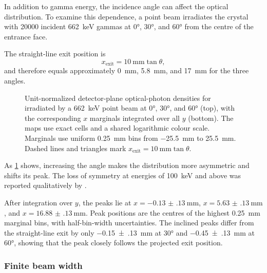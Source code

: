 In addition to gamma energy, the incidence angle can affect the optical distribution. To examine this dependence, a point beam irradiates the  crystal with \num{20000} incident \qty{662}{\kilo\electronvolt} gammas at \ang{0}, \ang{30}, and \ang{60} from the centre of the entrance face.

The straight-line exit position is
\begin{equation}
  x_{\mathrm{exit}}=\qty{10}{\milli\metre}\tan\theta,
\end{equation}
and therefore equals approximately \qty{0}{\milli\metre}, \qty{5.8}{\milli\metre}, and \qty{17}{\milli\metre} for the three angles.

\begin{figure}[H]
  \centering
  \caption{Unit-normalized detector-plane optical-photon densities for  irradiated by a \qty{662}{\kilo\electronvolt} point beam at \ang{0}, \ang{30}, and \ang{60} (top), with the corresponding $x$ marginals integrated over all $y$ (bottom). The maps use exact  cells and a shared logarithmic colour scale. Marginals use uniform \qty{0.25}{\milli\metre} bins from \qty{-25.5}{\milli\metre} to \qty{25.5}{\milli\metre}. Dashed lines and triangles mark $x_{\mathrm{exit}}=\qty{10}{\milli\metre}\tan\theta$.}
  \label{fig:angle-dependence}
\end{figure}

As \cref{fig:angle-dependence} shows, increasing the angle makes the distribution more asymmetric and shifts its peak. The loss of symmetry at energies of \qty{100}{\kilo\electronvolt} and above was reported qualitatively by \textcite[p. 36]{ovsiannikova2020light}.

After integration over $y$, the peaks lie at $x=\qty{-0.13(13)}{\milli\metre}$, $x=\qty{5.63(13)}{\milli\metre}$, and $x=\qty{16.88(13)}{\milli\metre}$. Peak positions are the centres of the highest \qty{0.25}{\milli\metre} marginal bins, with half-bin-width uncertainties. The inclined peaks differ from the straight-line exit by only \qty{-0.15(13)}{\milli\metre} at \ang{30} and \qty{-0.45(13)}{\milli\metre} at \ang{60}, showing that the peak closely follows the projected exit position.


\subsubsection{Finite beam width}

